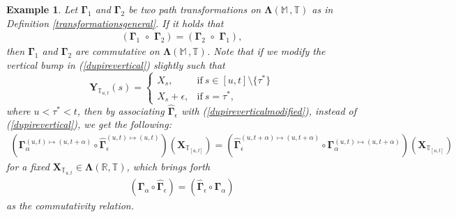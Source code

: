 \documentclass[12pt,a4paper]{article}
\newtheorem{ex}[thm]{Example}
\def\R{\mathbb{R}}
\def\M{\mathbb{M}}
\def\T{\mathbb{T}}
\begin{document}
\begin{ex}
\emph{Let $\boldsymbol{\Gamma}_{1}$ and $\boldsymbol{\Gamma}_{2}$ be two path transformations on $\boldsymbol{\Lambda}(\M \,, \T)$ as in Definition \ref{transformationsgeneral}. If it holds that
\begin{align}
\left(  \boldsymbol{\Gamma}_{1} \,\, \circ \,\, \boldsymbol{\Gamma}_{2} \right) = \left( \boldsymbol{\Gamma}_{2} \,\, \circ \,\, \boldsymbol{\Gamma}_{1} \right), 
\end{align}
then $\boldsymbol{\Gamma}_{1}$ and $\boldsymbol{\Gamma}_{2}$ are commutative on $\boldsymbol{\Lambda}(\M \,, \T)$.
Note that if we modify the \emph{vertical bump} in (\ref{dupirevertical}) slightly such that
\begin{equation}
\label{dupireverticalmodified}
    \boldsymbol{Y}_{\T_{u,t}}(s) =
\begin{cases}
      X_s, & \text{if}\ s\in [u,t] \setminus \{\tau^*\} \\
      X_s + \epsilon, & \text{if}\ s = \tau^*,
\end{cases}
\end{equation}
where $u < \tau^* < t$, then by associating $\boldsymbol{\hat{\Gamma}}_{\epsilon}$ with (\ref{dupireverticalmodified}), instead of (\ref{dupirevertical}), we get the following:
\begin{align}
\left(  \boldsymbol{\Gamma}_{\alpha}^{(u,t)\mapsto(u,t+\alpha)}  \circ \boldsymbol{\hat{\Gamma}}_{\epsilon}^{(u,t)\mapsto(u,t)} \right) \left( \boldsymbol{X}_{\T_{[u,t]}}\right) = \left( \boldsymbol{\hat{\Gamma}}_{\epsilon}^{(u,t+\alpha)\mapsto(u,t+\alpha)}  \circ  \boldsymbol{\Gamma}_{\alpha}^{(u,t)\mapsto(u,t+\alpha)} \right) \left( \boldsymbol{X}_{\T_{[u,t]}}\right) 
\end{align}
for a fixed $\boldsymbol{X}_{\T_{u,t}}\in \boldsymbol{\Lambda}(\R , \T)$, which brings forth
\begin{align}
\left(  \boldsymbol{\Gamma}_{\alpha} \circ \boldsymbol{\hat{\Gamma}}_{\epsilon} \right) = \left( \boldsymbol{\hat{\Gamma}}_{\epsilon}  \circ  \boldsymbol{\Gamma}_{\alpha} \right) 
\end{align}
as the commutativity relation.}
\end{ex}
\end{document}
